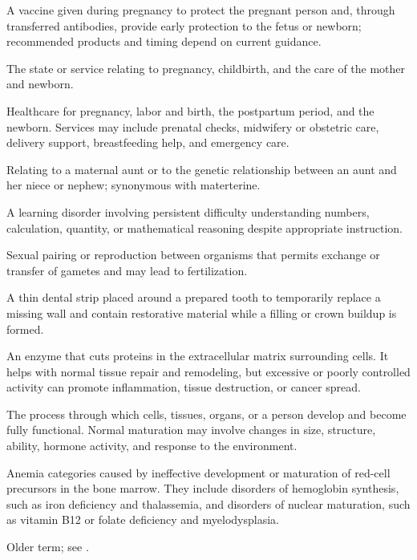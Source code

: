  A vaccine given during pregnancy to protect the pregnant person and, through transferred antibodies, provide early protection to the fetus or newborn; recommended products and timing depend on current guidance.

 The state or service relating to pregnancy, childbirth, and the care of the mother and newborn.

 Healthcare for pregnancy, labor and birth, the postpartum period, and the newborn. Services may include prenatal checks, midwifery or obstetric care, delivery support, breastfeeding help, and emergency care.

 Relating to a maternal aunt or to the genetic relationship between an aunt and her niece or nephew; synonymous with materterine.

 A learning disorder involving persistent difficulty understanding numbers, calculation, quantity, or mathematical reasoning despite appropriate instruction.

 Sexual pairing or reproduction between organisms that permits exchange or transfer of gametes and may lead to fertilization.

 A thin dental strip placed around a prepared tooth to temporarily replace a missing wall and contain restorative material while a filling or crown buildup is formed.

 An enzyme that cuts proteins in the extracellular matrix surrounding cells. It helps with normal tissue repair and remodeling, but excessive or poorly controlled activity can promote inflammation, tissue destruction, or cancer spread.

 The process through which cells, tissues, organs, or a person develop and become fully functional. Normal maturation may involve changes in size, structure, ability, hormone activity, and response to the environment.

 Anemia categories caused by ineffective development or maturation of red-cell precursors in the bone marrow. They include disorders of hemoglobin synthesis, such as iron deficiency and thalassemia, and disorders of nuclear maturation, such as vitamin B12 or folate deficiency and myelodysplasia.

 Older term; see .


